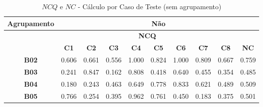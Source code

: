 \begin{table}[htbp]
	\centering
	\caption{$NCQ$ e $NC$ - Cálculo por Caso de Teste (sem agrupamento)}
	\begin{tabular}{|c|ccccccccc|}
		\hline
		\cellcolor[HTML]{F2F2F2}\textbf{Agrupamento} & \multicolumn{9}{c|}{Não} \\ \hline
		\rowcolor[HTML]{D0CECE} 
		\cellcolor[HTML]{D0CECE} & \multicolumn{8}{c|}{\cellcolor[HTML]{D0CECE}\textbf{NCQ}} & \cellcolor[HTML]{D0CECE} \\ \cline{2-9}
		\rowcolor[HTML]{D0CECE} 
		\multirow{-2}{*}{\cellcolor[HTML]{D0CECE}\textbf{Participante}} & \multicolumn{1}{c|}{\cellcolor[HTML]{D0CECE}\textbf{C1}} & \multicolumn{1}{c|}{\cellcolor[HTML]{D0CECE}\textbf{C2}} & \multicolumn{1}{c|}{\cellcolor[HTML]{D0CECE}\textbf{C3}} & \multicolumn{1}{c|}{\cellcolor[HTML]{D0CECE}\textbf{C4}} & \multicolumn{1}{c|}{\cellcolor[HTML]{D0CECE}\textbf{C5}} & \multicolumn{1}{c|}{\cellcolor[HTML]{D0CECE}\textbf{C6}} & \multicolumn{1}{c|}{\cellcolor[HTML]{D0CECE}\textbf{C7}} & \multicolumn{1}{c|}{\cellcolor[HTML]{D0CECE}\textbf{C8}} & \multirow{-2}{*}{\cellcolor[HTML]{D0CECE}\textbf{NC}} \\ \hline
		\textbf{B02} & \multicolumn{1}{c|}{0.606} & \multicolumn{1}{c|}{0.661} & \multicolumn{1}{c|}{0.556} & \multicolumn{1}{c|}{1.000} & \multicolumn{1}{c|}{0.824} & \multicolumn{1}{c|}{1.000} & \multicolumn{1}{c|}{0.809} & \multicolumn{1}{c|}{0.667} & 0.759 \\ \hline
		\rowcolor[HTML]{F2F2F2} 
		\textbf{B03} & \multicolumn{1}{c|}{\cellcolor[HTML]{F2F2F2}0.241} & \multicolumn{1}{c|}{\cellcolor[HTML]{F2F2F2}0.847} & \multicolumn{1}{c|}{\cellcolor[HTML]{F2F2F2}0.162} & \multicolumn{1}{c|}{\cellcolor[HTML]{F2F2F2}0.808} & \multicolumn{1}{c|}{\cellcolor[HTML]{F2F2F2}0.418} & \multicolumn{1}{c|}{\cellcolor[HTML]{F2F2F2}0.640} & \multicolumn{1}{c|}{\cellcolor[HTML]{F2F2F2}0.455} & \multicolumn{1}{c|}{\cellcolor[HTML]{F2F2F2}0.354} & 0.485 \\ \hline
		\textbf{B04} & \multicolumn{1}{c|}{0.180} & \multicolumn{1}{c|}{0.243} & \multicolumn{1}{c|}{0.463} & \multicolumn{1}{c|}{0.649} & \multicolumn{1}{c|}{0.778} & \multicolumn{1}{c|}{0.833} & \multicolumn{1}{c|}{0.621} & \multicolumn{1}{c|}{0.489} & 0.509 \\ \hline
		\rowcolor[HTML]{F2F2F2} 
		\textbf{B05} & \multicolumn{1}{c|}{\cellcolor[HTML]{F2F2F2}0.766} & \multicolumn{1}{c|}{\cellcolor[HTML]{F2F2F2}0.254} & \multicolumn{1}{c|}{\cellcolor[HTML]{F2F2F2}0.395} & \multicolumn{1}{c|}{\cellcolor[HTML]{F2F2F2}0.962} & \multicolumn{1}{c|}{\cellcolor[HTML]{F2F2F2}0.761} & \multicolumn{1}{c|}{\cellcolor[HTML]{F2F2F2}0.450} & \multicolumn{1}{c|}{\cellcolor[HTML]{F2F2F2}0.183} & \multicolumn{1}{c|}{\cellcolor[HTML]{F2F2F2}0.375} & 0.501 \\ \hline

\end{tabular}
\end{table}
